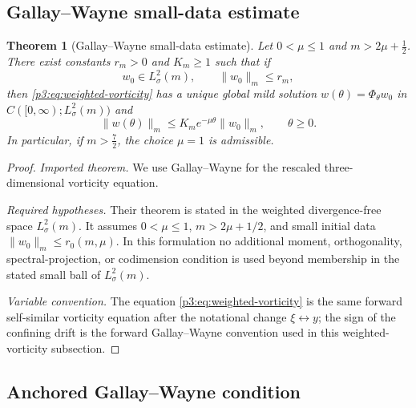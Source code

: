 \documentclass[11pt]{amsart}
\theoremstyle{plain}
\newtheorem{theorem}{Theorem}[section]
\theoremstyle{definition}
\theoremstyle{remark}
\numberwithin{equation}{section}
\begin{document}
\subsection{Gallay--Wayne small-data estimate}

\begin{theorem}[Gallay--Wayne small-data estimate]\label{p3:thm:gw-small-data}\label{p3:thm:gallay}
Let \(0<\mu\le1\) and \(m>2\mu+\frac12\).  There exist constants
\(r_m>0\) and \(K_m\ge1\) such that if
\[
   w_0\in L^2_\sigma(m),
   \qquad
   \|w_0\|_m\le r_m,
\]
then
\eqref{p3:eq:weighted-vorticity} has a unique global mild solution
\(w(\theta)=\Phi_\theta w_0\) in \(C([0,\infty);L^2_\sigma(m))\) and
\[
   \|w(\theta)\|_m
   \le
   K_m e^{-\mu\theta}\|w_0\|_m,\qquad \theta\ge0.
\]
In particular, if \(m>\frac72\), the choice \(\mu=1\) is admissible.
\end{theorem}

\begin{proof}
\smallskip
\noindent\emph{Imported theorem.}
We use Gallay--Wayne \cite[Theorem 2.3]{GallayWayne2002} for the rescaled
three-dimensional vorticity equation.

\smallskip
\noindent\emph{Required hypotheses.}
Their theorem is stated in the weighted divergence-free space
\(L^2_\sigma(m)\).  It assumes \(0<\mu\le1\), \(m>2\mu+1/2\), and small initial
data \(\|w_0\|_m\le r_0(m,\mu)\).  In this formulation no additional moment,
orthogonality, spectral-projection, or codimension condition is used beyond
membership in the stated small ball of \(L^2_\sigma(m)\).

\smallskip
\noindent\emph{Variable convention.}
The equation \eqref{p3:eq:weighted-vorticity} is the same forward
self-similar vorticity equation after the notational change
\(\xi\leftrightarrow y\); the sign of the confining drift is the forward
Gallay--Wayne convention used in this weighted-vorticity subsection.
\end{proof}

\subsection{Anchored Gallay--Wayne condition}
\end{document}
